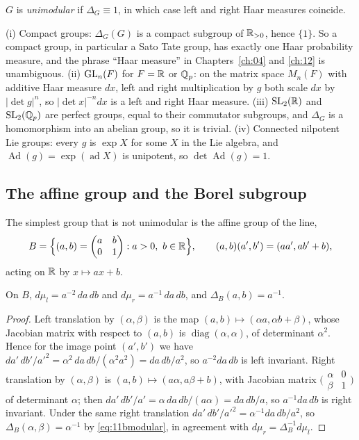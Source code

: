$G$ is \emph{unimodular} if $\Delta_G\equiv1$, in which case left and right Haar measures coincide.

\begin{example}\label{ex:11bunimodular}
(i) Compact groups: $\Delta_G(G)$ is a compact subgroup of $\mathbb{R}_{>0}$, hence $\{1\}$. So a compact group, in particular a Sato Tate group, has exactly one Haar probability measure, and the phrase ``Haar measure'' in Chapters~\ref{ch:04} and \ref{ch:12} is unambiguous. (ii) $\mathrm{GL}_n(F)$ for $F=\mathbb{R}$ or $\mathbb{Q}_p$: on the matrix space $M_n(F)$ with additive Haar measure $dx$, left and right multiplication by $g$ both scale $dx$ by $|\det g|^n$, so $|\det x|^{-n}dx$ is a left and right Haar measure. (iii) $\mathrm{SL}_2(\mathbb{R})$ and $\mathrm{SL}_2(\mathbb{Q}_p)$ are perfect groups, equal to their commutator subgroups, and $\Delta_G$ is a homomorphism into an abelian group, so it is trivial. (iv) Connected nilpotent Lie groups: every $g$ is $\exp X$ for some $X$ in the Lie algebra, and $\operatorname{Ad}(g)=\exp(\operatorname{ad}X)$ is unipotent, so $\det\operatorname{Ad}(g)=1$.
\end{example}

\subsection{The affine group and the Borel subgroup}

The simplest group that is not unimodular is the affine group of the line,
\[
B=\Bigl\{(a,b)=\begin{pmatrix}a&b\\0&1\end{pmatrix}:a>0,\ b\in\R\Bigr\},\qquad (a,b)(a',b')=(aa',ab'+b),
\]
acting on $\mathbb{R}$ by $x\mapsto ax+b$.

\begin{proposition}\label{thm:11baffine}
On $B$, $d\mu_l=a^{-2}\,da\,db$ and $d\mu_r=a^{-1}\,da\,db$, and $\Delta_B(a,b)=a^{-1}$.
\end{proposition}

\begin{proof}
Left translation by $(\alpha,\beta)$ is the map $(a,b)\mapsto(\alpha a,\alpha b+\beta)$, whose Jacobian matrix with respect to $(a,b)$ is $\operatorname{diag}(\alpha,\alpha)$, of determinant $\alpha^2$. Hence for the image point $(a',b')$ we have $da'\,db'/a'^2=\alpha^2\,da\,db/(\alpha^2a^2)=da\,db/a^2$, so $a^{-2}da\,db$ is left invariant. Right translation by $(\alpha,\beta)$ is $(a,b)\mapsto(a\alpha,a\beta+b)$, with Jacobian matrix $\bigl(\begin{smallmatrix}\alpha&0\\\beta&1\end{smallmatrix}\bigr)$ of determinant $\alpha$; then $da'\,db'/a'=\alpha\,da\,db/(a\alpha)=da\,db/a$, so $a^{-1}da\,db$ is right invariant. Under the same right translation $da'\,db'/a'^2=\alpha^{-1}da\,db/a^2$, so $\Delta_B(\alpha,\beta)=\alpha^{-1}$ by \eqref{eq:11bmodular}, in agreement with $d\mu_r=\Delta_B^{-1}d\mu_l$.
\end{proof}

